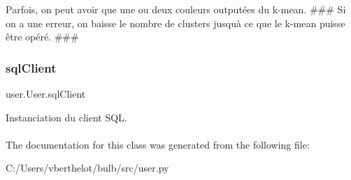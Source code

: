 Parfois, on peut avoir que une ou deux couleurs outputées du k-\/mean. \#\#\# Si on a une erreur, on baisse le nombre de clusters jusqu\textquotesingle{}à ce que le k-\/mean puisse être opéré. \#\#\# \mbox{\label{classuser_1_1_user_adf4a399faa3ea66427ecf7cb8a1bbb89}} 
\subsubsection{\texorpdfstring{sql\+Client}{sqlClient}}
{\footnotesize\ttfamily user.\+User.\+sql\+Client}



Instanciation du client S\+QL. 

\paragraph*{}

The documentation for this class was generated from the following file\+:\begin{DoxyCompactItemize}
\item 
C\+:/\+Users/vberthelot/bulb/src/user.\+py\end{DoxyCompactItemize}

